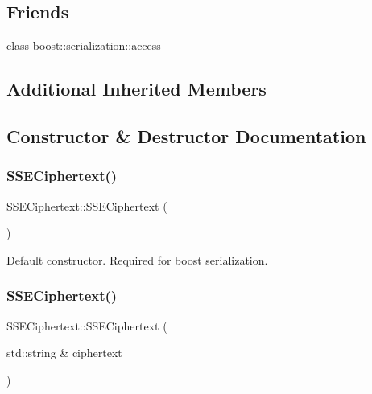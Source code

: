 \subsection*{Friends}
\begin{DoxyCompactItemize}
\item 
class \hyperlink{classSSECiphertext_ac98d07dd8f7b70e16ccb9a01abf56b9c}{boost\+::serialization\+::access}
\end{DoxyCompactItemize}
\subsection*{Additional Inherited Members}


\subsection{Constructor \& Destructor Documentation}
\mbox{\label{classSSECiphertext_af8584c9ba9fa27ff1c517fcbea5e0c23}} 
\subsubsection{\texorpdfstring{S\+S\+E\+Ciphertext()}{SSECiphertext()}\hspace{0.1cm}{\footnotesize\ttfamily [1/2]}}
{\footnotesize\ttfamily S\+S\+E\+Ciphertext\+::\+S\+S\+E\+Ciphertext (\begin{DoxyParamCaption}{ }\end{DoxyParamCaption})}

Default constructor. Required for {\ttfamily boost} serialization. \mbox{\label{classSSECiphertext_a77d3038e752e8ba2bca49361c422142f}} 
\subsubsection{\texorpdfstring{S\+S\+E\+Ciphertext()}{SSECiphertext()}\hspace{0.1cm}{\footnotesize\ttfamily [2/2]}}
{\footnotesize\ttfamily S\+S\+E\+Ciphertext\+::\+S\+S\+E\+Ciphertext (\begin{DoxyParamCaption}\item[{std\+::string \&}]{ciphertext }\end{DoxyParamCaption})}

